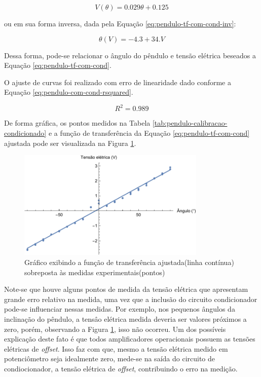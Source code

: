 \documentclass[a4paper]{instrumentacao}
\begin{document}
\begin{equation}
	V(\theta) = 0.029 \theta + 0.125
	\label{eq:pendulo-tf-com-cond}
\end{equation}

\noindent 
ou em sua forma inversa, dada pela Equação \ref{eq:pendulo-tf-com-cond-inv}:

\begin{equation}
	\theta(V) = -4.3 + 34. V
	\label{eq:pendulo-tf-com-cond-inv}
\end{equation}

Dessa forma, pode-se relacionar o ângulo do pêndulo e tensão elétrica beseados a Equação \ref{eq:pendulo-tf-com-cond}.

O ajuste de curvas foi realizado com erro de linearidade dado conforme a Equação \ref{eq:pendulo-com-cond-rsquared}.

\begin{equation}
	R^2 = 0.989
	\label{eq:pendulo-com-cond-rsquared}
\end{equation}

De forma gráfica, os pontos medidos na Tabela \ref{tab:pendulo-calibracao-condicionado} e a função de transferência da Equação \ref{eq:pendulo-tf-com-cond} ajustada pode ser visualizada na Figura \ref{fig:pendulo-tf-com-cond}.

\begin{figure}[H]
\centering
\includegraphics[width=0.8\textwidth]{Pendulo-Condicionado-fit.pdf}
\caption{Gráfico exibindo a função de transferência ajustada(linha contínua) sobreposta às medidas experimentais(pontos)}
\label{fig:pendulo-tf-com-cond}
\end{figure}

Note-se que houve alguns pontos de medida da tensão elétrica que apresentam grande erro relativo na medida, uma vez que a inclusão do circuito condicionador pode-se influenciar nessas medidas. Por exemplo, nos pequenos ângulos da inclinação do pêndulo, a tensâo elétrica medida deveria ser valores próximos a zero, porém, observando a Figura \ref{fig:pendulo-tf-com-cond}, isso não ocorreu. Um dos possíveis explicação deste fato é que todos amplificadores operacionais possuem as tensões elétricas de \textit{offset}. Isso faz com que, mesmo a tensão elétrica medido em potenciômetro seja idealmente zero, mede-se na saída do circuito de condiocionador, a tensão elétrica de \textit{offset}, contribuindo o erro na medição.  
\end{document}

